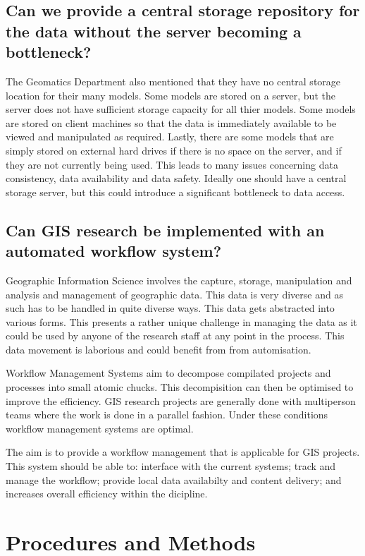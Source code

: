 \documentclass[12pt,a4paper]{article}
\begin{document}
\subsection{Can we provide a central storage repository for the data without the server becoming a bottleneck?}
The Geomatics Department also mentioned that they have no central
storage location for their many models. Some models are stored on
a server, but the server does not have sufficient storage capacity
for all thier models. Some models are stored on client machines so
that the data is immediately available to be viewed and manipulated
as required. Lastly, there are some models that are simply stored on
external hard drives if there is no space on the server, and if they
are not currently being used. This leads to many issues concerning
data consistency, data availability and data safety. Ideally one should
have a central storage server, but this could introduce a significant
bottleneck to data access.
\subsection{Can GIS research be implemented with an automated workflow system?}
Geographic Information Science involves the capture, storage, manipulation and analysis
and management of geographic data. This data is very diverse and as such has to be handled
in quite diverse ways. This data gets abstracted into various forms. This presents a
rather unique challenge in managing the data as it could be used by anyone of the research
staff at any point in the process. This data movement is laborious and could benefit from
from automisation.

Workflow Management Systems aim to decompose compilated projects and processes into
small atomic chucks. This decompisition can then be optimised to improve the efficiency.
GIS research projects are generally done with multiperson teams where the work is
done in a parallel fashion. Under these conditions workflow management systems
are optimal.

The aim is to provide a workflow management that is applicable for GIS projects.
This system should be able to: interface with the current systems; track and
manage the workflow; provide local data availabilty and content delivery; and
increases overall efficiency within the dicipline.

\section{Procedures and Methods}
\end{document}
